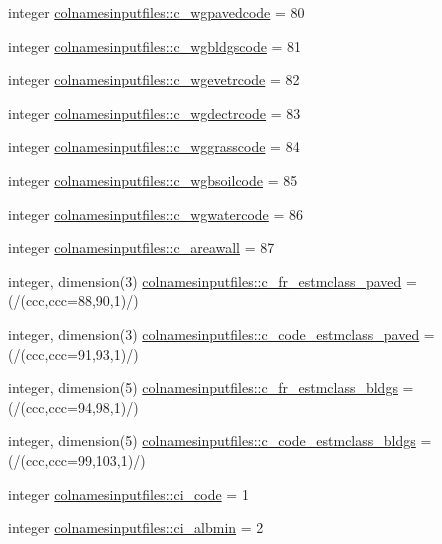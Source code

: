 \begin{DoxyCompactItemize}
\item 
integer \hyperlink{namespacecolnamesinputfiles_a594c158d8ed907d4e8ede7a8d0fc9240}{colnamesinputfiles\+::c\+\_\+wgpavedcode} = 80
\item 
integer \hyperlink{namespacecolnamesinputfiles_ab4583c3dc51d01a6708d3728f2d0bbed}{colnamesinputfiles\+::c\+\_\+wgbldgscode} = 81
\item 
integer \hyperlink{namespacecolnamesinputfiles_acd1aae2c74f1010dc8e96721d060ee2f}{colnamesinputfiles\+::c\+\_\+wgevetrcode} = 82
\item 
integer \hyperlink{namespacecolnamesinputfiles_a89c3978f772cf69717e7c3805a77546e}{colnamesinputfiles\+::c\+\_\+wgdectrcode} = 83
\item 
integer \hyperlink{namespacecolnamesinputfiles_ac42a1208e0193748f986358d69a536db}{colnamesinputfiles\+::c\+\_\+wggrasscode} = 84
\item 
integer \hyperlink{namespacecolnamesinputfiles_a1432fa29b516a47ff8bc0fc6afdcced2}{colnamesinputfiles\+::c\+\_\+wgbsoilcode} = 85
\item 
integer \hyperlink{namespacecolnamesinputfiles_ab1a74354fafd9099312c05386e7028c1}{colnamesinputfiles\+::c\+\_\+wgwatercode} = 86
\item 
integer \hyperlink{namespacecolnamesinputfiles_a363a58a1c4bf6e08cfc5567f4dab0754}{colnamesinputfiles\+::c\+\_\+areawall} = 87
\item 
integer, dimension(3) \hyperlink{namespacecolnamesinputfiles_ae645bd421cc1a42b61bf2534373660e5}{colnamesinputfiles\+::c\+\_\+fr\+\_\+estmclass\+\_\+paved} = (/(ccc,ccc=88,90,1)/)
\item 
integer, dimension(3) \hyperlink{namespacecolnamesinputfiles_a52858a619825d8cd3e612737eedfcbdb}{colnamesinputfiles\+::c\+\_\+code\+\_\+estmclass\+\_\+paved} = (/(ccc,ccc=91,93,1)/)
\item 
integer, dimension(5) \hyperlink{namespacecolnamesinputfiles_a8f2409ed101c2c4017086ab28b8d234a}{colnamesinputfiles\+::c\+\_\+fr\+\_\+estmclass\+\_\+bldgs} = (/(ccc,ccc=94,98,1)/)
\item 
integer, dimension(5) \hyperlink{namespacecolnamesinputfiles_a504446b38136e15c388676ef3df18a09}{colnamesinputfiles\+::c\+\_\+code\+\_\+estmclass\+\_\+bldgs} = (/(ccc,ccc=99,103,1)/)
\item 
integer \hyperlink{namespacecolnamesinputfiles_a0abf7a2adf2e8ef2d2b9b37c03042dbd}{colnamesinputfiles\+::ci\+\_\+code} = 1
\item 
integer \hyperlink{namespacecolnamesinputfiles_a4884dcd754a8bb891465ea1cece47110}{colnamesinputfiles\+::ci\+\_\+albmin} = 2

\end{DoxyCompactItemize}
